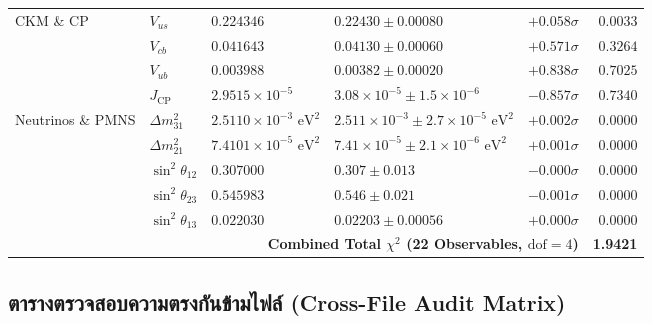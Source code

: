 \documentclass[11pt, a4paper]{article}
\begin{document}
{\begin{longtable}{p{2.5cm} l l p{3.9cm} r r}
\midrule
CKM \& CP & $V_{us}$ & $0.224346$ & $0.22430 \pm 0.00080$ & $+0.058\sigma$ & $0.0033$ \\
 & $V_{cb}$ & $0.041643$ & $0.04130 \pm 0.00060$ & $+0.571\sigma$ & $0.3264$ \\
 & $V_{ub}$ & $0.003988$ & $0.00382 \pm 0.00020$ & $+0.838\sigma$ & $0.7025$ \\
 & $J_{\text{CP}}$ & $2.9515 \times 10^{-5}$ & $3.08 \times 10^{-5} \pm 1.5 \times 10^{-6}$ & $-0.857\sigma$ & $0.7340$ \\
\midrule
Neutrinos \& PMNS & $\Delta m_{31}^2$ & $2.5110 \times 10^{-3}\text{ eV}^2$ & $2.511 \times 10^{-3} \pm 2.7 \times 10^{-5}\text{ eV}^2$ & $+0.002\sigma$ & $0.0000$ \\
 & $\Delta m_{21}^2$ & $7.4101 \times 10^{-5}\text{ eV}^2$ & $7.41 \times 10^{-5} \pm 2.1 \times 10^{-6}\text{ eV}^2$ & $+0.001\sigma$ & $0.0000$ \\
 & $\sin^2\theta_{12}$ & $0.307000$ & $0.307 \pm 0.013$ & $-0.000\sigma$ & $0.0000$ \\
 & $\sin^2\theta_{23}$ & $0.545983$ & $0.546 \pm 0.021$ & $-0.001\sigma$ & $0.0000$ \\
 & $\sin^2\theta_{13}$ & $0.022030$ & $0.02203 \pm 0.00056$ & $+0.000\sigma$ & $0.0000$ \\
\midrule
\multicolumn{5}{r}{\textbf{Combined Total $\chi^2$ (22 Observables, $\text{dof} = 4$)}} & \textbf{1.9421} \\
\end{longtable}
}


\subsection{ตารางตรวจสอบความตรงกันข้ามไฟล์ (Cross-File Audit Matrix)}
\end{document}
